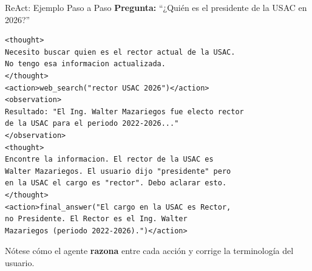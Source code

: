 \documentclass[aspectratio=169]{beamer}
\begin{document}
\begin{frame}[fragile]{ReAct: Ejemplo Paso a Paso}
    \textbf{Pregunta:} ``¿Quién es el presidente de la USAC en 2026?''
    
    \vspace{0.2cm}
\begin{lstlisting}[style=xmlstyle]
<thought>
Necesito buscar quien es el rector actual de la USAC.
No tengo esa informacion actualizada.
</thought>
<action>web_search("rector USAC 2026")</action>
<observation>
Resultado: "El Ing. Walter Mazariegos fue electo rector 
de la USAC para el periodo 2022-2026..."
</observation>
<thought>
Encontre la informacion. El rector de la USAC es 
Walter Mazariegos. El usuario dijo "presidente" pero 
en la USAC el cargo es "rector". Debo aclarar esto.
</thought>
<action>final_answer("El cargo en la USAC es Rector, 
no Presidente. El Rector es el Ing. Walter 
Mazariegos (periodo 2022-2026).")</action>
\end{lstlisting}

    \vspace{0.2cm}
    Nótese cómo el agente \textbf{razona} entre cada acción y corrige la terminología del usuario.
\end{frame}
\end{document}
